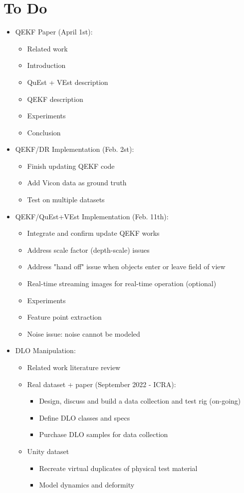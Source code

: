 \documentclass[11pt]{article}
\begin{document}
\section{To Do}
\begin{itemize}
  \item QEKF Paper (April 1st):
  \begin{itemize}
      \item Related work
      \item Introduction
      \item QuEst + VEst description
      \item QEKF description
      \item Experiments
      \item Conclusion
  \end{itemize}
  \item QEKF/DR Implementation (Feb. 2st):
  \begin{itemize}
      \item Finish updating QEKF code
      \item Add Vicon data as ground truth
      \item Test on multiple datasets
  \end{itemize}
  \item QEKF/QuEst+VEst Implementation (Feb. 11th):
  \begin{itemize}
      \item Integrate and confirm update QEKF works
      \item Address scale factor (depth-scale) issues
      \item Address "hand off" issue when objects enter or leave field of view
      \item Real-time streaming images for real-time operation (optional)
      \item Experiments
      \item Feature point extraction
      \item Noise issue: noise cannot be modeled
  \end{itemize}
  \item  DLO Manipulation:
  \begin{itemize}
      \item Related work literature review
      \item Real dataset + paper (September 2022 - ICRA):
      \begin{itemize}
            \item Design, discuss and build a data collection and test rig (on-going)
            \item Define DLO classes and specs
            \item Purchase DLO samples for data collection
      \end{itemize}
      \item Unity dataset
      \begin{itemize}
            \item Recreate virtual duplicates of physical test material
            \item Model dynamics and deformity
      \end{itemize}
  \end{itemize}
\end{itemize}
\end{document}
